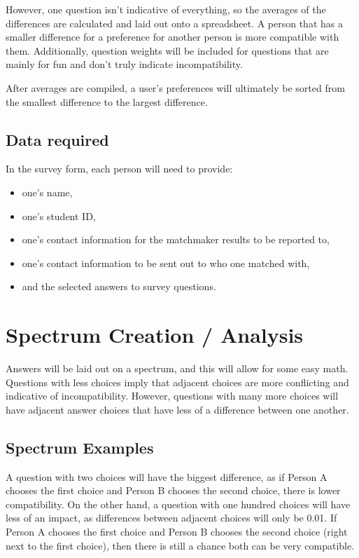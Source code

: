 \documentclass[12pt]{article}
\begin{document}
However, one question isn't indicative of everything, so the averages of the
differences are calculated and laid out onto a spreadsheet. A person that has a
smaller difference for a preference for another person is more compatible with
them. Additionally, question weights will be included for questions that are
mainly for fun and don't truly indicate incompatibility.

After averages are compiled, a user's preferences will ultimately be sorted from
the smallest difference to the largest difference.

\subsection{Data required}
In the survey form, each person will need to provide:
\begin{itemize}
    \item one's name,
    \item one's student ID,
    \item one's contact information for the matchmaker results to be reported to,
    \item one's contact information to be sent out to who one matched with,
    \item and the selected answers to survey questions.
\end{itemize}

\section{Spectrum Creation / Analysis}
Answers will be laid out on a spectrum, and this will allow for some easy math.
Questions with less choices imply that adjacent choices are more conflicting and
indicative of incompatibility. However, questions with many more choices will
have adjacent answer choices that have less of a difference between one
another.

\subsection{Spectrum Examples}
A question with two choices will have the biggest difference, as if Person A chooses the
first choice and Person B chooses the second choice, there is lower compatibility.
On the other hand, a question with one hundred choices will have less of an
impact, as differences between adjacent choices will only be 0.01. If Person A
chooses the first choice and Person B chooses the second choice (right next to
the first choice), then there is still a chance both can be very compatible.
\end{document}
